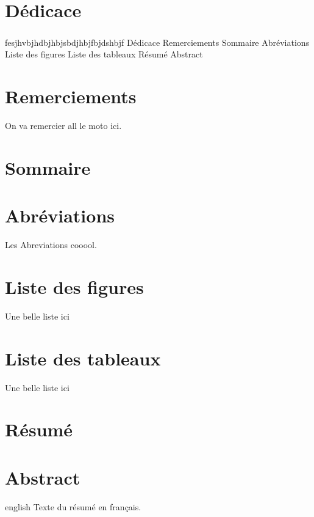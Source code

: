 \documentclass[10pt,a4paper]{report}
\author{Tidjani}
\begin{document}
\chapter*{Dédicace}
	\paragraph{}
	fesjhvbjhdbjhbjsbdjhbjfbjdshbjf
	Dédicace
Remerciements
Sommaire
Abréviations
Liste des figures
Liste des tableaux
Résumé
Abstract


\chapter*{Remerciements}         %
 On va remercier all le moto ici.

\chapter*{Sommaire}
 \tableofcontents*{}
 	
\chapter*{Abréviations}
  Les Abreviations cooool.

\chapter*{Liste des figures}
  Une belle liste ici
  
\chapter*{Liste des tableaux}
  Une belle liste ici

\chapter*{Résumé}                      %

\chapter*{Abstract}
\begin{otherlanguage*}{english}
  Texte du résumé en français.
\end{otherlanguage*}
\end{document}
